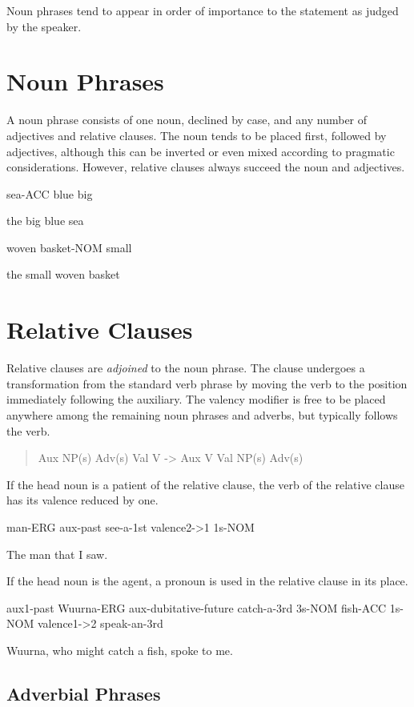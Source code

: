 Noun phrases tend to appear in order of importance to the statement as judged by
the speaker.

\section{Noun Phrases}

A noun phrase consists of one noun, declined by case, and any number of
adjectives and relative clauses. The noun tends to be placed first, followed by
adjectives, although this can be inverted or even mixed according to pragmatic
considerations. However, relative clauses always succeed the noun and
adjectives.

sea-ACC blue big

the big blue sea

woven basket-NOM small

the small woven basket

\section{Relative Clauses}

Relative clauses are \textit{adjoined} to the noun phrase. The clause undergoes
a transformation from the standard verb phrase by moving the verb to the
position immediately following the auxiliary. The valency modifier is free to be
placed anywhere among the remaining noun phrases and adverbs, but typically
follows the verb.

\begin{quote}

Aux NP(s) Adv(s) Val V -> Aux V Val NP(s) Adv(s)

\end{quote}

If the head noun is a patient of the relative clause, the verb of the relative
clause has its valence reduced by one.

man-ERG aux-past see-a-1st valence2->1 1s-NOM

The man that I saw.

If the head noun is the agent, a pronoun is used in the relative clause in its
place.

aux1-past Wuurna-ERG aux-dubitative-future catch-a-3rd 3s-NOM fish-ACC 1s-NOM
valence1->2 speak-an-3rd

Wuurna, who might catch a fish, spoke to me.

\subsection{Adverbial Phrases}
\label{advsyntax}

